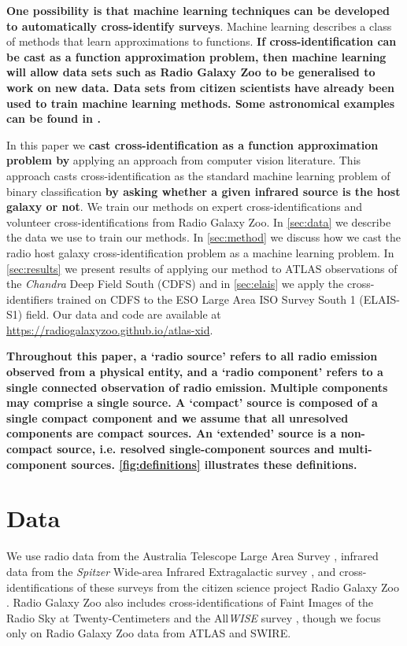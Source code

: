 \documentclass[fleqn,usenatbib,usedcolumn]{mnras}
\newcommand{\edited}[1]{{\bf {#1}}}
\begin{document}
  \edited{One possibility is that machine learning techniques can
  be developed to automatically cross-identify surveys}. Machine learning
  describes a class of methods that learn approximations to functions. \edited{If
  cross-identification can be cast as a function approximation problem, then machine learning will allow data
  sets such as Radio Galaxy Zoo to be generalised to work on new data. Data sets from
  citizen scientists have already been used to train machine learning methods.
  Some astronomical examples can be found in \citet{marshall15citizenscience}.}

  In this paper we \edited{cast cross-identification as a function
  approximation problem by} applying an approach from computer vision
  literature. This approach casts cross-identification as the standard machine
  learning problem of binary classification \edited{by asking whether a given
  infrared source is the host galaxy or not}. We train our methods on expert
  cross-identifications and volunteer cross-identifications from Radio Galaxy Zoo. In
  \autoref{sec:data} we describe the data we use to train our methods. In
  \autoref{sec:method} we discuss how we cast the radio host galaxy
  cross-identification problem as a machine learning problem. In
  \autoref{sec:results} we present results of applying our method to ATLAS
  observations of the \emph{Chandra} Deep Field South (CDFS) and in
  \autoref{sec:elais} we apply the cross-identifiers trained on CDFS to the
  ESO Large Area ISO Survey South 1 (ELAIS-S1) field. Our data and code are
  available at \url{https://radiogalaxyzoo.github.io/atlas-xid}.

  \edited{Throughout this paper, a `radio source' refers to all radio emission observed from
  a physical entity, and a `radio component' refers to a single connected
  observation of radio emission. Multiple components may comprise a single
  source. A `compact' source is composed of a single compact component and we
  assume that all unresolved components are compact sources. An `extended'
  source is a non-compact source, i.e. resolved single-component sources and
  multi-component sources. \autoref{fig:definitions} illustrates these definitions.}

\section{Data}\label{sec:data}

  We use radio data from the Australia Telescope Large Area Survey
  \citep[ATLAS;][]{norris06,franzen15}, infrared data from the \emph{Spitzer}
  Wide-area Infrared Extragalactic survey \citep[SWIRE;][]{lonsdale03swire,
  surace05swire}, and cross-identifications of these surveys from the citizen
  science project Radio Galaxy Zoo \citep{banfield15}. Radio Galaxy Zoo also
  includes cross-identifications of Faint Images of the Radio Sky at
  Twenty-Centimeters \citep[FIRST;][]{white97first} and the All\emph{WISE}
  survey \citep{cutri2013wiseexplanatory}, though we focus only on Radio
  Galaxy Zoo data from ATLAS and SWIRE.
\end{document}
